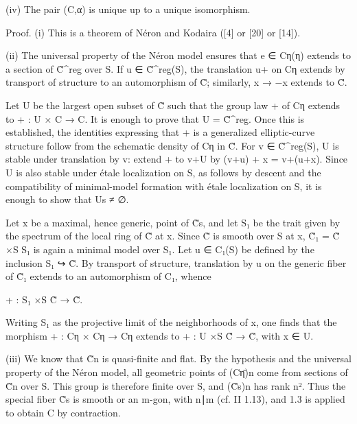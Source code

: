 \documentclass[11pt,a4paper]{article}
\begin{document}
(iv) The pair (C,α) is unique up to a unique isomorphism.

Proof. (i) This is a theorem of Néron and Kodaira ([4] or [20] or [14]).

(ii) The universal property of the Néron model ensures that e ∈ C\textunderscore{}η(η) extends to a section of C̃\textasciicircum{}reg over S. If u ∈ C̃\textasciicircum{}reg(S), the translation u+ on C\textunderscore{}η extends by transport of structure to an automorphism of C̃; similarly, x → −x extends to C̃.

Let U be the largest open subset of C̃ such that the group law + of C\textunderscore{}η extends to + : U × C → C. It is enough to prove that U = C̃\textasciicircum{}reg. Once this is established, the identities expressing that + is a generalized elliptic-curve structure follow from the schematic density of C\textunderscore{}η in C̃. For v ∈ C̃\textasciicircum{}reg(S), U is stable under translation by v: extend + to v+U by (v+u) + x = v+(u+x). Since U is also stable under étale localization on S, as follows by descent and the compatibility of minimal-model formation with étale localization on S, it is enough to show that U\textunderscore{}s ≠ ∅.

Let x be a maximal, hence generic, point of C̃\textunderscore{}s, and let S₁ be the trait given by the spectrum of the local ring of C̃ at x. Since C̃ is smooth over S at x, C̃₁ = C̃ ×\textunderscore{}S S₁ is again a minimal model over S₁. Let u ∈ C₁(S) be defined by the inclusion S₁ ↪ C̃. By transport of structure, translation by u on the generic fiber of C̃₁ extends to an automorphism of C₁, whence

+ : S₁ ×\textunderscore{}S C̃ → C̃.

Writing S₁ as the projective limit of the neighborhoods of x, one finds that the morphism + : C\textunderscore{}η × C\textunderscore{}η → C\textunderscore{}η extends to + : U ×\textunderscore{}S C̃ → C̃, with x ∈ U.

(iii) We know that C̃\textunderscore{}n is quasi-finite and flat. By the hypothesis and the universal property of the Néron model, all geometric points of (C\textunderscore{}η̄)\textunderscore{}n come from sections of C̃\textunderscore{}n over S. This group is therefore finite over S, and (C̃\textunderscore{}s)\textunderscore{}n has rank n². Thus the special fiber C̃\textunderscore{}s is smooth or an m-gon, with n∣m (cf. II 1.13), and 1.3 is applied to obtain C by contraction.
\end{document}
